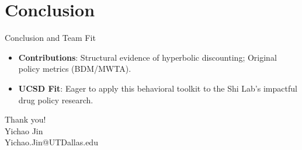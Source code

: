 \documentclass[10pt]{beamer}
\begin{document}
\section{Conclusion}

\begin{frame}{Conclusion and Team Fit}
    \begin{itemize}
        \item \textbf{Contributions}: Structural evidence of hyperbolic discounting; Original policy metrics (BDM/MWTA).
        \item \textbf{UCSD Fit}: Eager to apply this behavioral toolkit to the Shi Lab's impactful drug policy research.
    \end{itemize}
    \begin{center}
        \Huge Thank you! \\
        \vspace{1em}
        \large Yichao Jin \\
        \small Yichao.Jin@UTDallas.edu
    \end{center}
\end{frame}
\end{document}

